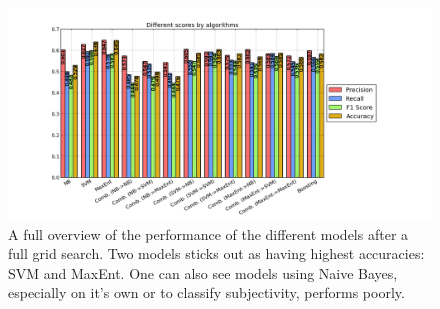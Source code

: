 \begin{figure}
 \begin{center}
     \includegraphics[width=\linewidth]{../img/plots/grid/full.png}
 \end{center}
 \caption[Results overview across models]{A full overview of the performance of the different models after a full grid search. Two models sticks out as having highest accuracies: SVM and MaxEnt. One can also see models using Naive Bayes, especially on it's own or to classify subjectivity, performs poorly.}
 \label{fig:results_full}
\end{figure}



